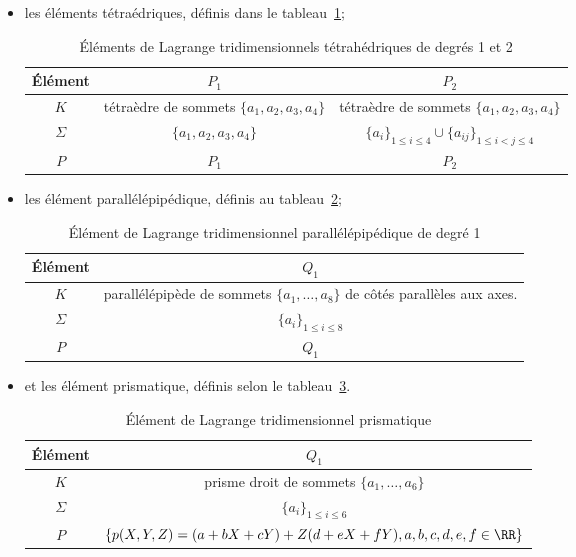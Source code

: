 \begin{itemize}
\item les éléments tétraédriques, définis dans le tableau~\ref{tab:Elem:tri};
\begin{table}[ht]\centering\small
\begin{tabular}{c|cc}
Élément & $P_1$ & $P_2$ \\
\hline
$K$	   & tétraèdre de sommets $\{a_1, a_2, a_3, a_4\}$ & tétraèdre de sommets $\{a_1, a_2, a_3, a_4\}$\\
$\Sigma$  & $\{a_1, a_2, a_3, a_4\}$ & $\{a_i\}_{1\le i\le4}\cup\{a_{ij}\}_{1\le i<j\le 4}$ \\
$P$      & $P_1$ & $P_2$ \\
\hline
\end{tabular}
\caption{Éléments de Lagrange tridimensionnels tétrahédriques de degrés 1 et 2}\label{tab:Elem:tri}
\end{table}
\item les élément parallélépipédique, définis au tableau~\ref{tab:Elem:para};
\begin{table}[ht]\centering\small
\begin{tabular}{c|c}
Élément & $Q_1$\\
\hline
$K$ & parallélépipède de sommets $\{a_1,\ldots, a_8\}$ de côtés parallèles aux axes.\\
$\Sigma$ & $\{a_i\}_{1\le i\le8}$\\
$P$ & $Q_1$\\
\hline
\end{tabular}
\caption{Élément de Lagrange tridimensionnel parallélépipédique de degré 1}\label{tab:Elem:para}
\end{table}
\item et les élément prismatique, définis selon le tableau~\ref{tab:Elem:pri}.
\begin{table}[ht]\centering\small
\begin{tabular}{c|c}
Élément & $Q_1$\\
\hline
$K$ & prisme droit de sommets $\{a_1,\ldots, a_6\}$\\
$\Sigma$ & $\{a_i\}_{1\le i\le6}$\\
$P$ & $\{p(X,Y,Z) = (a + bX + cY ) + Z(d + eX + fY ), a,b,c,d,e,f\in\RR\}$\\
\hline
\end{tabular}
\caption{Élément de Lagrange tridimensionnel prismatique}\label{tab:Elem:pri}
\end{table}
\end{itemize}


